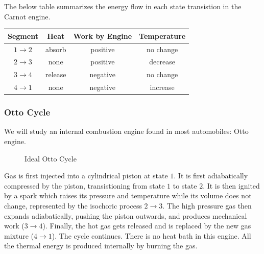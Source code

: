 \documentclass[12pt, a4paper]{article}
\begin{document}
The below table summarizes the energy flow in each state transistion in the Carnot engine.

\begin{center}
\begin{tabular}{c|c|c|c}
  Segment & Heat & Work \textbf{by} Engine & Temperature \\
  \hline
  $1\to2$ & absorb & positive & no change \\
  \hline
  $2\to3$ & none & positive & decrease \\
  \hline
  $3\to4$ & release & negative & no change \\
  \hline
  $4\to1$ & none & negative & increase
\end{tabular}
\end{center}

\subsubsection{Otto Cycle}

We will study an internal combustion engine found in most automobiles: Otto engine.

\begin{figure}[H]
\centering
{}
\caption{Ideal Otto Cycle}
\end{figure}

Gas is first injected into a cylindrical piston at state $1$. It is first adiabatically compressed by the piston, transistioning from state $1$ to state $2$. It is then ignited by a spark which raises its pressure and temperature while its volume does not change, represented by the isochoric process $2\to3$. The high pressure gas then expands adiabatically, pushing the piston outwards, and produces mechanical work ($3\to4$). Finally, the hot gas gets released and is replaced by the new gas mixture ($4\to1$). The cycle continues. There is no heat bath in this engine. All the thermal energy is produced internally by burning the gas. \\
\end{document}

